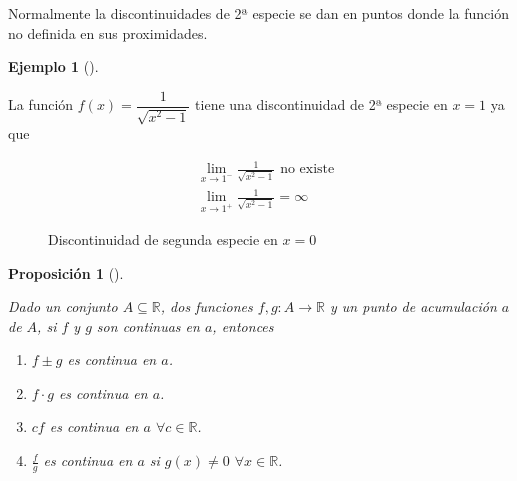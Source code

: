 \documentclass[
  a4paper,
]{scrreport}
\providecommand{\tightlist}{%
  \setlength{\itemsep}{0pt}\setlength{\parskip}{0pt}}\usepackage{longtable,booktabs,array}
\theoremstyle{plain}
\theoremstyle{plain}
\newtheorem{proposition}{Proposición}[chapter]
\theoremstyle{definition}
\theoremstyle{definition}
\newtheorem{example}{Ejemplo}[chapter]
\theoremstyle{plain}
\theoremstyle{remark}
\begin{document}
Normalmente la discontinuidades de 2ª especie se dan en puntos donde la
función no definida en sus proximidades.

\leavevmode{}%
\begin{example}[]\label{exm-discontinuidad-2-especie}

La función \(f(x)=\dfrac{1}{\sqrt{x^2-1}}\) tiene una discontinuidad de
2ª especie en \(x=1\) ya que

\begin{align*}
& \lim_{x\to 1^-}\frac{1}{\sqrt{x^2-1}} \textrm{ no existe}  \\
& \lim_{x\to 1^+}\frac{1}{\sqrt{x^2-1}}=\infty
\end{align*}

\begin{figure}

{\centering 



}

\caption{Discontinuidad de segunda especie en \(x=0\)}

\end{figure}

\end{example}

\leavevmode{}%
\begin{proposition}[]\label{prp-algebra-funciones-continuas}

Dado un conjunto \(A\subseteq \mathbb{R}\), dos funciones
\(f,g:A\to \mathbb{R}\) y un punto de acumulación \(a\) de \(A\), si
\(f\) y \(g\) son continuas en \(a\), entonces

\begin{enumerate}
\def\labelenumi{\alph{enumi}.}
\tightlist
\item
  \(f\pm g\) es continua en \(a\).
\item
  \(f\cdot g\) es continua en \(a\).
\item
  \(cf\) es continua en \(a\) \(\forall c\in\mathbb{R}\).
\item
  \(\frac{f}{g}\) es continua en \(a\) si \(g(x)\neq 0\)
  \(\forall x\in\mathbb{R}\).
\end{enumerate}

\end{proposition}
\end{document}
